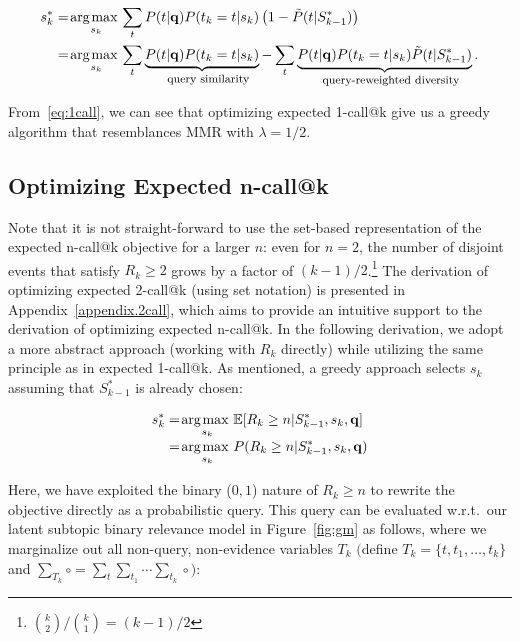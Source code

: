 \begin{align}
s_k^* & = \argmax_{s_{k}} \sum_{t} P(t|\vec{q}) P(t_k=t|s_k) \left( 1 - \tilde{P}(t | S_{k-1}^*) \right) \nonumber \\
      & = \argmax_{s_{k}} \sum_{t} \underbrace{P(t|\vec{q}) P(t_k=t|s_k)}_{\mbox{\footnotesize query similarity}} - \sum_{t} \underbrace{P(t|\vec{q}) P(t_k=t|s_k) \tilde{P}(t | S_{k-1}^*)}_{\mbox{\footnotesize query-reweighted diversity}}. \label{eq:1call}
\end{align}

From~\eqref{eq:1call}, we can see that optimizing expected 1-call@k give us a greedy algorithm that resemblances MMR with $\lambda = 1/2$.

\subsection{Optimizing Expected n-call@k}
Note that it is not straight-forward to use the set-based representation of the expected n-call@k objective for a larger $n$: even for $n=2$, the number of disjoint events that satisfy $R_k \geq 2$ grows by a factor of $(k-1)/2$.\footnote{$\binom{k}{2} / \binom{k}{1} = (k-1)/2$}
The derivation of optimizing expected 2-call@k (using set notation) is presented in Appendix~\ref{appendix.2call}, which aims to provide an intuitive support to the derivation of optimizing expected n-call@k. 
In the following derivation, we adopt a more abstract approach (working with $R_k$ directly) while utilizing the same principle as in expected 1-call@k.
As mentioned, a greedy approach selects $s_k$ assuming that $S_{k-1}^*$ is already chosen:

\begin{align}
  s_k^* & = \argmax_{s_k} \mathbb{E}[R_k\geq n|S_{k-1}^*,s_k,\vec{q}] \nonumber\\[-1mm]
  & = \argmax_{s_k} P(R_k\geq n|S_{k-1}^*,s_k,\vec{q}) \nonumber 
\end{align}

Here, we have exploited the binary ($0,1$) nature of $R_k \geq n$ to rewrite the objective
directly as a probabilistic query.
This query can be evaluated w.r.t.\ our latent subtopic binary relevance
model in Figure~\ref{fig:gm} as follows, where we marginalize out
all non-query, non-evidence variables $T_k$ $\big($define
$T_k\!=\!\{t,t_1,\dots,t_k\}$ and 
$\sum_{T_k} \circ = \sum_t \sum_{t_1} \cdots \sum_{t_k} \circ \big)$:

